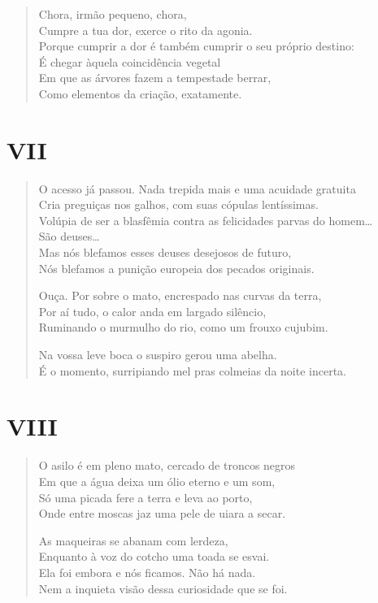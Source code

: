 {\begin{verse}
Chora, irmão pequeno, chora,\\
Cumpre a tua dor, exerce o rito da agonia.\\
Porque cumprir a dor é também cumprir o seu próprio destino:\\
É chegar àquela coincidência vegetal\\
Em que as árvores fazem a tempestade berrar,\\
Como elementos da criação, exatamente.
\end{verse}

\medskip
\section*{VII}

\begin{verse}
O acesso já passou. Nada trepida mais e uma acuidade gratuita\\
Cria preguiças nos galhos, com suas cópulas lentíssimas.\\
Volúpia de ser a blasfêmia contra as felicidades parvas do homem\ldots{}\\
São deuses\ldots{}\\
Mas nós blefamos esses deuses desejosos de futuro,\\
Nós blefamos a punição europeia dos pecados originais.

Ouça. Por sobre o mato, encrespado nas curvas da terra,\\
Por aí tudo, o calor anda em largado silêncio,\\
Ruminando o murmulho do rio, como um frouxo cujubim.

Na vossa leve boca o suspiro gerou uma abelha.\\
É o momento, surripiando mel pras colmeias da noite incerta.
\end{verse}

\medskip
\section*{VIII}

\begin{verse}
O asilo é em pleno mato, cercado de troncos negros\\
Em que a água deixa um ólio eterno e um som,\\
Só uma picada fere a terra e leva ao porto,\\
Onde entre moscas jaz uma pele de uiara a secar.

As maqueiras se abanam com lerdeza,\\
Enquanto à voz do cotcho uma toada se esvai.\\
Ela foi embora e nós ficamos. Não há nada.\\
Nem a inquieta visão dessa curiosidade que se foi.
\end{verse}

}

